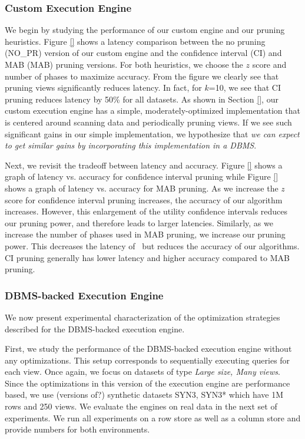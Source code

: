\subsubsection*{Custom Execution Engine}
We begin by studying the performance of our custom engine and our pruning
heuristics. 
Figure \ref{} shows a latency comparison between the no pruning (NO\_PR) version
of our custom engine and the confidence interval (CI) and MAB (MAB) pruning
versions.
For both heuristics, we choose the $z$ score and number of phases to maximize
accuracy.
From the figure we clearly see that pruning views significantly reduces
latency.
In fact, for $k$=10, we see that CI pruning reduces latency by 50\% for all
datasets.
As shown in Section \ref{}, our custom execution engine has a simple,
moderately-optimized implementation that is centered around scanning data and
periodically pruning views.
If we see such significant gains in our simple implementation, we hypothesize
that {\it we can expect to get similar gains by incorporating this
implementation in a DBMS}.

Next, we revisit the tradeoff between latency and accuracy. 
Figure \ref{} shows a graph of latency vs. accuracy for confidence interval
pruning while Figure \ref{} shows a graph of latency vs. accuracy for MAB
pruning.
As we increase the $z$ score for confidence interval pruning increases, the
accuracy of our algorithm increases.
However, this enlargement of the utility confidence intervals reduces our
pruning power, and therefore leads to larger latencies.
Similarly, as we increase the number of phases used in MAB pruning, we increase
our pruning power. 
This decreases the latency of \VizRecDB\ but reduces the accuracy of our
algorithms.
CI pruning generally has lower latency and higher accuracy compared to MAB
pruning. 

\subsubsection*{DBMS-backed Execution Engine}

We now present experimental characterization of the optimization
strategies described for the DBMS-backed execution engine.

First, we study the performance of the DBMS-backed execution engine without any
optimizations. 
This setup corresponds to sequentially executing queries for each view.
Once again, we focus on datasets of type {\it Large size, Many views}.
Since the optimizations in this version of the execution engine are performance
based, we use (versions of?) synthetic datasets SYN3, SYN3* which have 1M rows
and 250 views.
We evaluate the engines on real data in the next set of experiments.
We run all experiments on a row store as well as a column store and provide
numbers for both environments.

